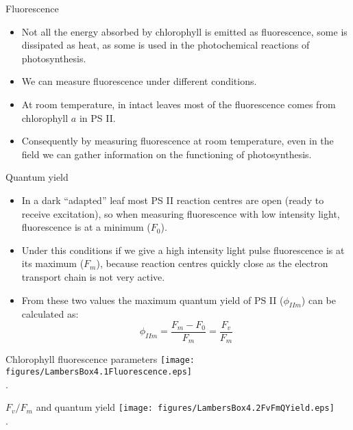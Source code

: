 \documentclass[10pt]{beamer}
\begin{document}
\begin{frame}{Fluorescence}
    \begin{itemize}
        \item Not all the energy absorbed by chlorophyll is
        emitted as fluorescence, some is dissipated as heat, as some
        is used in the photochemical reactions of photosynthesis.
        \item We can measure fluorescence under different
        conditions.
        \item At room temperature, in intact leaves most of the
        fluorescence comes from chlorophyll $a$ in PS II.
        \item Consequently by measuring fluorescence at room
        temperature, even in the field we can gather information on
        the functioning of photosynthesis.
    \end{itemize}
\end{frame}

\begin{frame}{Quantum yield}
    \begin{itemize}
        \item In a dark ``adapted'' leaf most PS II reaction centres are
        open (ready to receive excitation), so when measuring
        fluorescence with low intensity light, fluorescence is at a
        minimum ($F_0$).
        \item Under this conditions if we give a high intensity
        light pulse fluorescence is at its maximum ($F_m$), because reaction
        centres quickly close as the electron transport chain is not
        very active.
        \item From these two values the maximum quantum yield of PS II
        ($\phi_{IIm}$) can be calculated as:
        $$\phi_{IIm} = \frac{F_m - F_0}{F_m} = \frac{F_v}{F_m}$$
    \end{itemize}
\end{frame}

\begin{frame}{Chlorophyll fluorescence parameters}
    \centering
    \texttt{[image: figures/LambersBox4.1Fluorescence.eps]}\\
    {\small \autocite[from][]{LambersEtAl1998}.}
\end{frame}

\begin{frame}{$F_v/F_m$ and quantum yield}
    \centering
    \texttt{[image: figures/LambersBox4.2FvFmQYield.eps]}\\
    {\small \autocite[from][]{LambersEtAl1998}.}
\end{frame}
\end{document}
